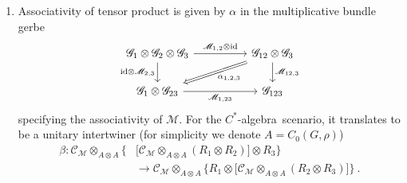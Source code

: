 \documentclass[a4paper,11pt]{article}
\newcommand{\Rep}{\textbf{Rep}}
\newcommand{\be}{\begin{equation}}
\newcommand{\ee}{\end{equation}}
\newcommand{\ba}{\begin{aligned}}
\newcommand{\ea}{\end{aligned}}
\def\bbC{\mathbb{C}}
\def\CC{\mathcal{C}}
\def\CT{\mathcal{T}}
\def\calg{$C^*$-algebra\ }
\def\hilb{{\rm Hilb}}
\begin{document}
\begin{enumerate}
    \be  \ba
    &C_0(G,\rho) \otimes C_0(G,\rho) \cong C_0(G\times G,(p_1+p_2)^*\rho) \\
    &Y^{[3]}\times Y^{[3]} \stackrel{\rho \times \rho }{\longrightarrow} U(1) \times U(1) \stackrel{m}{\longrightarrow} U(1) 
    \ea \ee
    which transforms $\rho$ on $\mathscr{G}$ into $p_1^*\rho+p_2^*\rho$ on $p_1^*\mathscr{G}\otimes p^*_2\mathscr{G}$. The equivalence of bundle gerbes $\mathscr{M}$ dictates that the two pullbacks differs only by a coboundary
    \be p_1^*\rho + p_2^*\rho = m^*\rho + d \upsilon  \ . \ee
    This provides an invertible $C^*$-correspondence \be\mathcal{T}_{\mathscr{M}} \in {\rm Corr}\Big(C_0(G\times G,m^*\rho),C_0(G\times G,p_1^*\rho + p_2^*\rho)\Big) \ . \ee
    By taking relative tensor (Rieffel tensor) with 
    \be C_0(G\times G,m^*\rho)\in {\rm Corr}\big( C_0(G,\rho) ,  C_0(G\times G,m^*\rho) \big) \ , \ee
    we get the correspondence we want
    \be
    \mathcal{C}_{\mathscr{M}} := C_0(G\times G,m^*\rho) \otimes_{C_0(G\times G,m^*\rho)} \CT_{\mathscr{M}} \in {\rm Corr}\Big(C_0(G,\rho) , C_0(G,\rho)\otimes C_0(G,\rho)\Big) \ .
    \ee
    For any $R_1, R_2 \in \Rep(C_0(G,\rho))$, the monoidal structure of the category gives
    \be \ba \otimes_{\hilb^k(G)} : R_1 \otimes R_2  \mapsto   \CC_{\mathscr{M}} \otimes_{C_0(G,\rho) \otimes C_0(G,\rho)} (R_1 \otimes R_2) \in &{\rm Corr}(C_0(G,\rho), \bbC) \\ &= \Rep(C_0(G,\rho))  \ . \ea\ee
    \item Associativity of tensor product is given by $\alpha$ in the multiplicative bundle gerbe
    \be
    \begin{tikzcd}
\mathscr{G}_1\otimes \mathscr{G}_2\otimes \mathscr{G}_3 \arrow[d, "{{\rm id }\otimes \mathscr{M}_{2,3}}"'] \arrow[rr, "{\mathscr{M}_{1,2}\otimes {\rm id}}"] &  & \mathscr{G}_{12}\otimes \mathscr{G}_3 \arrow[d, "{\mathscr{M}_{12,3}}"] \arrow[lld, "{\alpha_{1,2,3}}", Rightarrow] \\
\mathscr{G}_{1}\otimes \mathscr{G}_{23} \arrow[rr, "{\mathscr{M}_{1,23}}"']                                                                          &  & \mathscr{G}_{123}                                                                                                      
\end{tikzcd}\ee
specifying the associativity of $\mathscr{M}$. For the \calg scenario, it translates to be a unitary intertwiner (for simplicity we denote $A = C_0(G,\rho)$)
\be\ba
\beta : \CC_\mathscr{M}\otimes_{A\otimes A}\Big\{ &\Big[ \CC_\mathscr{M}\otimes_{A\otimes A}( R_1 \otimes R_2) \Big] \otimes R_3 \Big\} \\ &\to \CC_\mathscr{M}\otimes_{A\otimes A} \Big\{R_1\otimes\Big[\CC_\mathscr{M}\otimes_{A\otimes A}(R_2\otimes R_3)\Big]\Big\} \ .
\ea\ee
\end{enumerate}
\end{document}
